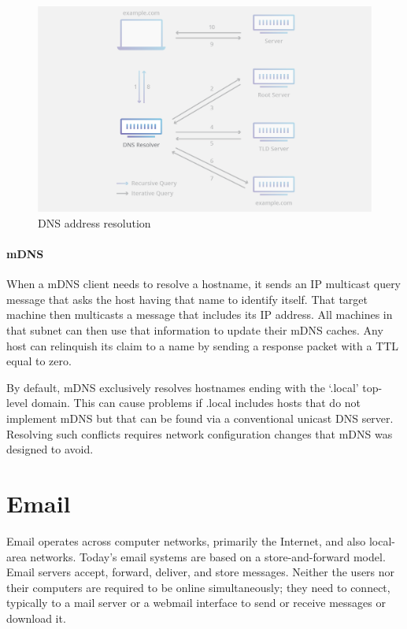 \begin{figure}
\centering
\includegraphics[width=\textwidth]{images/applications/recursive-resolver.png}
\caption{\acs{DNS} address resolution}
\label{fig:dns}
\end{figure}



\paragraph{\acs{mDNS}}
When a \acl{mDNS} client needs to resolve a hostname, it sends an \acs{IP} multicast query message that asks the host having that name to identify itself.
That target machine then multicasts a message that includes its \acs{IP} address.
All machines in that subnet can then use that information to update their \acs{mDNS} caches.
Any host can relinquish its claim to a name by sending a response packet with a \acf{TTL} equal to zero.

By default, \acs{mDNS} exclusively resolves hostnames ending with the `.local' top-level domain.
This can cause problems if .local includes hosts that do not implement \acs{mDNS} but that can be found via a conventional unicast \acs{DNS} server.
Resolving such conflicts requires network configuration changes that \acs{mDNS} was designed to avoid.


\section{Email}
Email operates across computer networks, primarily the Internet, and also local-area networks.
Today's email systems are based on a store-and-forward model.
Email servers accept, forward, deliver, and store messages.
Neither the users nor their computers are required to be online simultaneously; they need to connect, typically to a mail server or a webmail interface to send or receive messages or download it.


